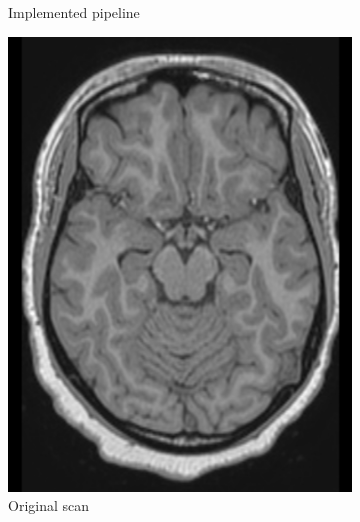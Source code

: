 \documentclass{standalone}
\begin{document}
\begin{figure}[h!]
\begin{subfigure}[b]{0.325\textwidth}
             \caption{Implemented pipeline}
        \end{subfigure}
        \hfill
        \begin{subfigure}[b]{0.325\textwidth}
             \includegraphics[scale=0.12]{img/Chap3/T1W54.jpg}
             \caption{Original scan}
        \end{subfigure}
        \hfill
        \begin{subfigure}[b]{0.325\textwidth}

\end{subfigure}
\end{figure}
\end{document}
